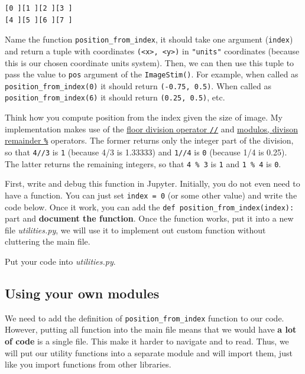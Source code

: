 \documentclass[
]{book}
\begin{document}
\begin{verbatim}
[0 ][1 ][2 ][3 ]
[4 ][5 ][6 ][7 ]
\end{verbatim}

Name the function \texttt{position\_from\_index}, it should take one argument (\texttt{index}) and return a tuple with coordinates \texttt{(\textless{}x\textgreater{},\ \textless{}y\textgreater{})} in \texttt{"units"} coordinates (because this is our chosen coordinate units system). Then, we can then use this tuple to pass the value to \texttt{pos} argument of the \texttt{ImageStim()}. For example, when called as \texttt{position\_from\_index(0)} it should return \texttt{(-0.75,\ 0.5)}. When called as \texttt{position\_from\_index(6)} it should return \texttt{(0.25,\ 0.5)}, etc.

Think how you compute position from the index given the size of image. My implementation makes use of the \href{https://python-reference.readthedocs.io/en/latest/docs/operators/floor_division.html}{floor division operator \texttt{//}} and \href{https://python-reference.readthedocs.io/en/latest/docs/operators/modulus.html}{modulos, divison remainder \texttt{\%}} operators. The former returns only the integer part of the division, so that \texttt{4//3} is \texttt{1} (because 4/3 is 1.33333) and \texttt{1//4} is \texttt{0} (because 1/4 is 0.25). The latter returns the remaining integers, so that \texttt{4\ \%\ 3} is \texttt{1} and \texttt{1\ \%\ 4} is \texttt{0}.

First, write and debug this function in Jupyter. Initially, you do not even need to have a function. You can just set \texttt{index\ =\ 0} (or some other value) and write the code below. Once it work, you can add the \texttt{def\ position\_from\_index(index):} part and \textbf{document the function}. Once the function works, put it into a new file \emph{utilities.py}, we will use it to implement out custom function without cluttering the main file.

Put your code into \emph{utilities.py}.

\hypertarget{using-your-own-modules}{%
\subsection{Using your own modules}\label{using-your-own-modules}}

We need to add the definition of \texttt{position\_from\_index} function to our code. However, putting all function into the main file means that we would have \textbf{a lot of code} is a single file. This make it harder to navigate and to read. Thus, we will put our utility functions into a separate module and will import them, just like you import functions from other libraries.
\end{document}
